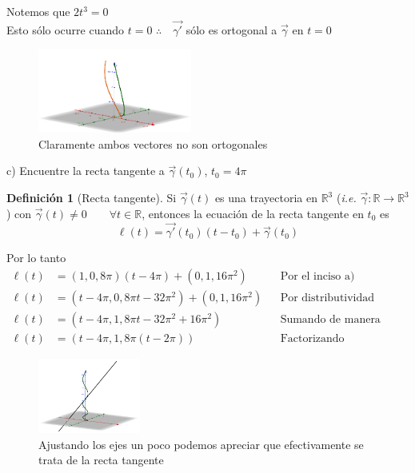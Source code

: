 \documentclass[letterpaper]{article}
\renewcommand{\l}{\ell}
\newcommand{\R}{\mathds{R}}
\renewcommand{\*}{\cdot}
\theoremstyle{definition}
\newtheorem{definition}{Definición}
\begin{document}
 \begin{center}
 Notemos que $ 2t^3 = 0 $\\
 Esto sólo ocurre cuando $ t = 0 $
 $ \therefore \quad \vec{\gamma'}$ sólo es ortogonal a $ \vec{\gamma} $ en $ t= 0 $
 \end{center}
\begin{figure}[h!]
	\centering
	\includegraphics[width=0.45\textwidth]{img/Proyecto4_2.png}
	\caption{Claramente ambos vectores no son ortogonales}
\end{figure}
\noindent c) Encuentre la recta tangente a $\vec{\gamma}(t_0)$,  $t_0 = 4\pi$
\begin{definition}[Recta tangente]
	Si $ \vec{\gamma}(t) $ es una trayectoria en $ \R^3 $ (\textit{i.e. } $ \vec{\gamma} : \R \to \R^3 $) con $ \vec{\gamma}(t) \neq 0 \qquad \forall t \in \R$, entonces la ecuación de la recta tangente en $ t_0 $ es 
	\[  \l(t) = \vec{\gamma'}(t_0)(t-t_0) + \vec{\gamma}(t_0)  \]
\end{definition}
Por lo tanto 
\begin{align*}
	\l(t) &= (1,0,8\pi)(t - 4\pi) + (0,1,16\pi^2) && \text{Por el inciso a)}\\
	\l(t) &= (t - 4\pi,0,8\pi t - 32\pi^2) + (0,1,16\pi^2) && \text{Por distributividad}\\
	\l(t) &= (t - 4\pi,1,8\pi t - 32\pi^2 + 16\pi^2) && \text{Sumando de manera directa}\\
	\l(t) &= (t - 4\pi,1,8\pi( t -  2\pi)) && \text{Factorizando}
\end{align*}

\begin{figure}[h!]
	\centering
	\includegraphics[width=0.3\textwidth]{img/Proyecto4_3.png}
	\caption{\small Ajustando los ejes un poco podemos apreciar que efectivamente se trata de la recta tangente }
\end{figure}
\end{document}
